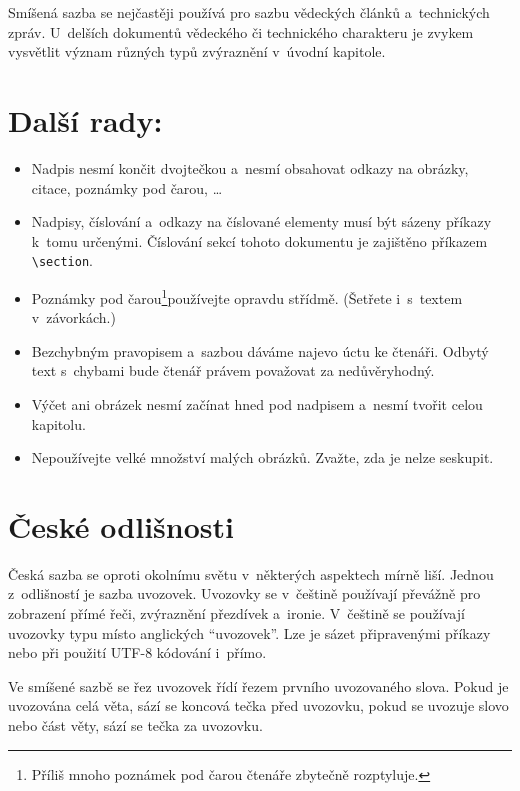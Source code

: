 \documentclass[czech,a4paper,10pt,twocolumn]{article}
\begin{document}
Smíšená sazba se nejčastěji používá pro sazbu vědeckých článků a~technických zpráv.
U~delších dokumentů vědeckého či technického charakteru je zvykem vysvětlit význam různých typů zvýraznění v~úvodní kapitole.

\hypertarget{d2}{\section{Další rady:}}

\begin{itemize}
\item Nadpis nesmí končit dvojtečkou a~nesmí obsahovat odkazy na obrázky, citace, poznámky pod čarou, \dots
\item Nadpisy, číslování a~odkazy na číslované elementy musí být sázeny příkazy k~tomu určenými. Číslování sekcí tohoto dokumentu je zajištěno příkazem \verb|\section|.
\item Poznámky pod čarou\footnote{Příliš mnoho poznámek pod čarou čtenáře zbytečně rozptyluje.}používejte opravdu střídmě. (Šetřete i~s~textem v~závorkách.)
\item Bezchybným pravopisem a~sazbou dáváme najevo úctu ke čtenáři. Odbytý text s~chybami bude čtenář právem považovat za nedůvěryhodný.
\item Výčet ani obrázek nesmí začínat hned pod nadpisem a~nesmí tvořit celou kapitolu.
\item Nepoužívejte velké množství malých obrázků. Zvažte, zda je nelze seskupit.
\end{itemize}

\section{České odlišnosti}

Česká sazba se oproti okolnímu světu v~některých aspektech mírně liší. Jednou z~odlišností je sazba uvozovek. Uvozovky se v~češtině používají převážně pro zobrazení přímé řeči, zvýraznění přezdívek a~ironie. V~češtině se používají uvozovky typu  místo anglických ``uvozovek''. Lze je sázet připravenými příkazy nebo při použití UTF-8 kódování i~přímo.

Ve smíšené sazbě se řez uvozovek řídí řezem prvního uvozovaného slova. Pokud je uvozována celá věta, sází se koncová tečka před uvozovku, pokud se uvozuje slovo nebo část věty, sází se tečka za uvozovku.
\end{document}
